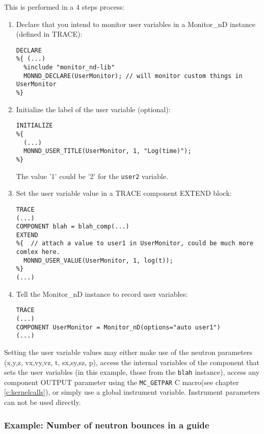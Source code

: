 This is performed in a 4 steps process:
\begin{enumerate}
\item Declare that you intend to monitor user variables in a Monitor\_nD instance (defined in TRACE):
\begin{verbatim}
DECLARE
%{ (...)
  %include "monitor_nd-lib"
  MONND_DECLARE(UserMonitor); // will monitor custom things in UserMonitor
%}
\end{verbatim}
\item Initialize the label of the user variable (optional):
\begin{verbatim}
INITIALIZE
%{
  (...)
  MONND_USER_TITLE(UserMonitor, 1, "Log(time)");
%}
\end{verbatim}
The value '1' could be '2' for the \verb+user2+ variable.
\item Set the user variable value in a TRACE component EXTEND block:
\begin{verbatim}
TRACE
(...)
COMPONENT blah = blah_comp(...)
EXTEND
%{  // attach a value to user1 in UserMonitor, could be much more comlex here.
  MONND_USER_VALUE(UserMonitor, 1, log(t));
%}
(...)
\end{verbatim}
\item Tell the Monitor\_nD instance to record user variables:
\begin{verbatim}
TRACE
(...)
COMPONENT UserMonitor = Monitor_nD(options="auto user1")
(...)
\end{verbatim}
\end{enumerate}
Setting the user variable values may either make use of the neutron parameters (x,y,z, vx,vy,vz, t, sx,sy,sz, p), access the internal variables of the component that sets the user variables (in this example, those from the \verb+blah+ instance), access any component OUTPUT parameter  using the \verb+MC_GETPAR+ C macro(see chapter \ref{c:kernelcalls}), or simply use a global instrument variable. Instrument parameters can not be used directly.

\subsubsection{Example: Number of neutron bounces in a guide}

